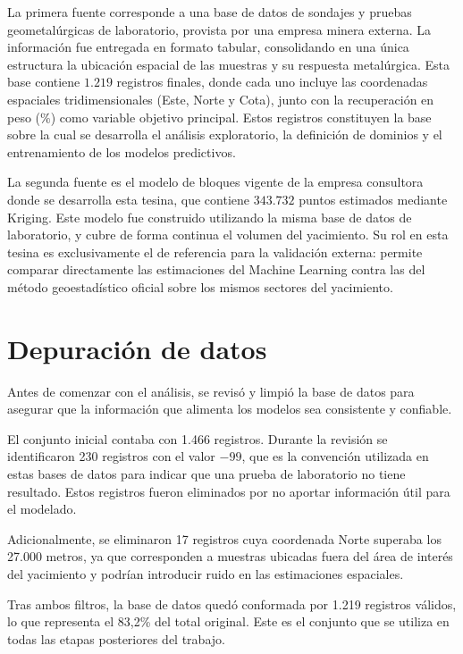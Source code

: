 \documentclass[12pt,letterpaper]{article}
\begin{document}
	La primera fuente corresponde a una base de datos de sondajes y pruebas 
	geometalúrgicas de laboratorio, provista por una empresa minera externa. La 
	información fue entregada en formato tabular, consolidando en una única estructura 
	la ubicación espacial de las muestras y su respuesta metalúrgica. Esta base contiene 
	$1.219$ registros finales, donde cada uno incluye las coordenadas espaciales 
	tridimensionales (Este, Norte y Cota), junto con la recuperación en peso ($\%$) como 
	variable objetivo principal. Estos registros constituyen la base sobre la cual se 
	desarrolla el análisis exploratorio, la definición de dominios y el entrenamiento 
	de los modelos predictivos.
	
	La segunda fuente es el modelo de bloques vigente de la empresa consultora donde 
	se desarrolla esta tesina, que contiene $343.732$ puntos estimados mediante Kriging. 
	Este modelo fue construido utilizando la misma base de datos de laboratorio, y cubre 
	de forma continua el volumen del yacimiento. Su rol en esta tesina es exclusivamente 
	el de referencia para la validación externa: permite comparar directamente las 
	estimaciones del Machine Learning contra las del método geoestadístico oficial sobre 
	los mismos sectores del yacimiento.
	
	\section{Depuración de datos}
	
	Antes de comenzar con el análisis, se revisó y limpió la base de datos para 
	asegurar que la información que alimenta los modelos sea consistente y confiable.
	
	El conjunto inicial contaba con 1.466 registros. Durante la revisión se identificaron 230 registros con el valor $-99$, que es la convención utilizada en estas bases de datos para indicar que una prueba de laboratorio no tiene resultado. Estos registros fueron eliminados por no aportar información útil para el modelado.
	
	Adicionalmente, se eliminaron 17 registros cuya coordenada Norte superaba los 
	27.000 metros, ya que corresponden a muestras ubicadas fuera del área de interés del yacimiento y podrían introducir ruido en las estimaciones espaciales.
	
	Tras ambos filtros, la base de datos quedó conformada por 1.219 registros válidos, lo que representa el 83,2\% del total original. Este es el conjunto que se utiliza en todas las etapas posteriores del trabajo.
	
\end{document}
